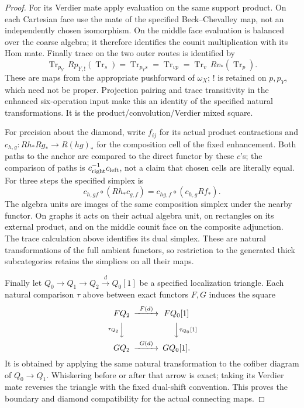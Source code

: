 \documentclass[11pt]{article}
\theoremstyle{definition}
\theoremstyle{remark}
\begin{document}
\begin{proof}
For its Verdier mate apply evaluation on the same support product.
On each Cartesian face use the mate of the specified
Beck--Chevalley map, not an independently chosen isomorphism.
On the middle face evaluation is balanced over the coarse algebra;
it therefore identifies the counit multiplication with its Hom
mate.  Finally trace on the two outer routes is identified by
\[
 \operatorname{Tr}_{p_Y}\,Rp_{Y,!}(\operatorname{Tr}_s)
  =\operatorname{Tr}_{p_Ys}
  =\operatorname{Tr}_{vp}
  =\operatorname{Tr}_v\,Rv_*(\operatorname{Tr}_p).
\]
These are maps from the appropriate pushforward of $\omega_X$;
$!$ is retained on $p,p_Y$, which need not be proper.  Projection
pairing and trace transitivity in the enhanced six-operation input
make this an identity of the specified natural transformations.
It is the product/convolution/Verdier mixed square.

For precision about the diamond, write $f_{ij}$ for its actual
product contractions and $c_{h,g}:Rh_*Rg_*\to R(hg)_*$ for the
composition cell of the fixed enhancement.  Both paths to the
anchor are compared to the direct functor by these $c$'s; the
comparison of paths is $c_{\rm right}^{-1}c_{\rm left}$, not a
claim that chosen cells are literally equal.  For three steps the
specified simplex is
\[
 c_{h,gf}\circ(Rh_*c_{g,f})
   =c_{hg,f}\circ(c_{h,g}Rf_*).
\]
The algebra units are images of the same composition simplex under
the nearby functor.  On graphs it acts on their actual algebra
unit, on rectangles on its external product, and on the middle
counit face on the composite adjunction.  The trace calculation
above identifies its dual simplex.  These are natural transformations
of the full ambient functors, so restriction to the generated thick
subcategories retains the simplices on all their maps.

Finally let $Q_0\to Q_1\to Q_2\xrightarrow{d}Q_0[1]$ be a
specified localization triangle.  Each natural comparison $\tau$
above between exact functors $F,G$ induces the square
\[
\begin{CD}
 FQ_2 @>{F(d)}>> FQ_0[1]\\
 @V{\tau_{Q_2}}VV @VV{\tau_{Q_0}[1]}V\\
 GQ_2 @>{G(d)}>> GQ_0[1].
\end{CD}
\]
It is obtained by applying the same natural transformation to the
cofiber diagram of $Q_0\to Q_1$.  Whiskering before or after that
arrow is exact; taking its Verdier mate reverses the triangle with
the fixed dual-shift convention.  This proves the boundary and
diamond compatibility for the actual connecting maps.
\end{proof}
\end{document}
